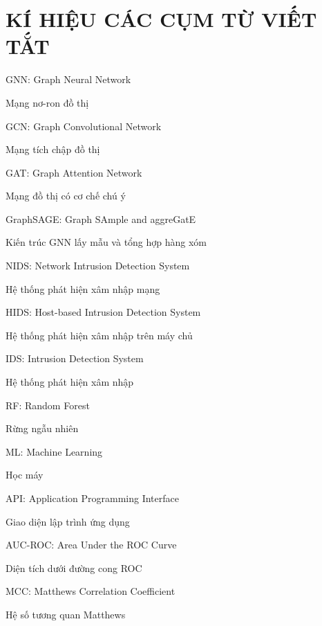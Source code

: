 \chapter*{KÍ HIỆU CÁC CỤM TỪ VIẾT TẮT}

\vspace{0.3cm}

\newcommand{\abbrline}[2]{%
  \noindent\begin{minipage}[t]{0.5\textwidth}#1\end{minipage}%
  \hspace{0.5cm}%
  \begin{minipage}[t]{0.35\textwidth}#2\end{minipage}\par\vspace{0.4cm}%
}

\abbrline{GNN: Graph Neural Network}{Mạng nơ-ron đồ thị}
\abbrline{GCN: Graph Convolutional Network}{Mạng tích chập đồ thị}
\abbrline{GAT: Graph Attention Network}{Mạng đồ thị có cơ chế chú ý}
\abbrline{GraphSAGE: Graph SAmple and aggreGatE}{Kiến trúc GNN lấy mẫu và tổng hợp hàng xóm}
\abbrline{NIDS: Network Intrusion Detection System}{Hệ thống phát hiện xâm nhập mạng}
\abbrline{HIDS: Host-based Intrusion Detection System}{Hệ thống phát hiện xâm nhập trên máy chủ}
\abbrline{IDS: Intrusion Detection System}{Hệ thống phát hiện xâm nhập}
\abbrline{RF: Random Forest}{Rừng ngẫu nhiên}
\abbrline{ML: Machine Learning}{Học máy}
\abbrline{API: Application Programming Interface}{Giao diện lập trình ứng dụng}
\abbrline{AUC-ROC: Area Under the ROC Curve}{Diện tích dưới đường cong ROC}
\abbrline{MCC: Matthews Correlation Coefficient}{Hệ số tương quan Matthews}